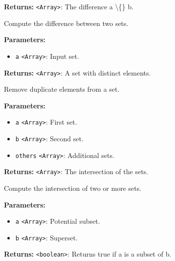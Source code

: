 \documentclass[12pt,a4paper]{article}
\begin{document}
\noindent \textbf{Returns:} \texttt{<Array>}: The difference a \textbackslash\{\} b.

\noindent Compute the difference between two sets.

\vspace{5mm}
\noindent {}


\noindent \textbf{Parameters:}
\begin{itemize}
  \item \texttt{a} \texttt{<Array>}: Input set.
\end{itemize}

\noindent \textbf{Returns:} \texttt{<Array>}: A set with distinct elements.

\noindent Remove duplicate elements from a set.

\vspace{5mm}
\noindent {}


\noindent \textbf{Parameters:}
\begin{itemize}
  \item \texttt{a} \texttt{<Array>}: First set.
  \item \texttt{b} \texttt{<Array>}: Second set.
  \item \texttt{others} \texttt{<Array>}: Additional sets.
\end{itemize}

\noindent \textbf{Returns:} \texttt{<Array>}: The intersection of the sets.

\noindent Compute the intersection of two or more sets.

\vspace{5mm}
\noindent {}


\noindent \textbf{Parameters:}
\begin{itemize}
  \item \texttt{a} \texttt{<Array>}: Potential subset.
  \item \texttt{b} \texttt{<Array>}: Superset.
\end{itemize}

\noindent \textbf{Returns:} \texttt{<boolean>}: Returns true if a is a subset of b.
\end{document}

